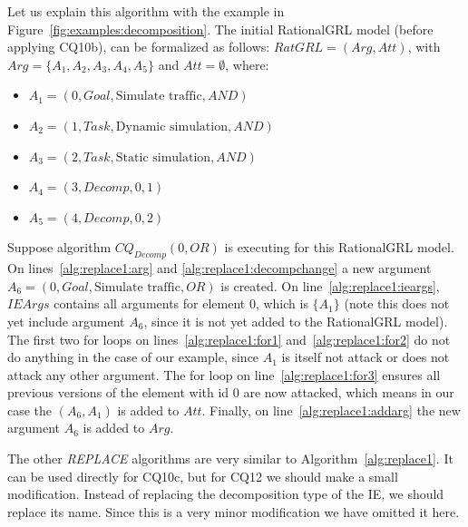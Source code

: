Let us explain this algorithm with the example in Figure~\ref{fig:examples:decomposition}. The initial RationalGRL model (before applying CQ10b), can be formalized as follows: $RatGRL=(Arg,Att)$, with $Arg=\{A_1,A_2,A_3,A_4,A_5\}$ and $Att=\emptyset$, where:
\begin{itemize}
\item $A_1=(0,Goal,\text{Simulate traffic},AND)$
\item $A_2=(1,Task,\text{Dynamic simulation},AND)$
\item $A_3=(2,Task,\text{Static simulation},AND)$
\item $A_4=(3,Decomp,0,1)$
\item $A_5=(4,Decomp,0,2)$
\end{itemize}

Suppose algorithm $CQ_{Decomp}(0, OR)$ is executing for this RationalGRL model. On lines~\ref{alg:replace1:arg} and \ref{alg:replace1:decompchange} a new argument $A_6=(0,Goal,\text{Simulate traffic},OR)$ is created. On line~\ref{alg:replace1:ieargs}, $IEArgs$ contains all arguments for element 0, which is $\{A_1\}$ (note this does not yet include argument $A_6$, since it is not yet added to the RationalGRL model). The first two for loops on lines~\ref{alg:replace1:for1} and~\ref{alg:replace1:for2} do not do anything in the case of our example, since $A_1$ is itself not attack or does not attack any other argument. The for loop on line~\ref{alg:replace1:for3} ensures all previous versions of the element with id 0 are now attacked, which means in our case the $(A_6,A_1)$ is added to $Att$. Finally, on line~\ref{alg:replace1:addarg} the new argument $A_6$ is added to $Arg$.

The other \emph{REPLACE} algorithms are very similar to Algorithm~\ref{alg:replace1}. It can be used directly for CQ10c, but for CQ12 we should make a small modification. Instead of replacing the decomposition type of the IE, we should replace its name. Since this is a very minor modification we have omitted it here.
